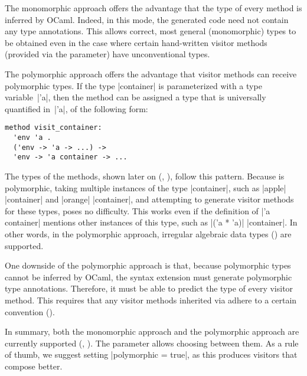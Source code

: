 \documentclass[11pt,a4paper,twoside]{article}
\begin{document}
The monomorphic approach offers the advantage that the type of every method is
inferred by OCaml. Indeed, in this mode, the generated code need not contain
any type annotations. This allows correct, most general (monomorphic) types to
be obtained even in the case where certain hand-written visitor methods
(provided via the \ancestors parameter) have unconventional types.
%

The polymorphic approach offers the advantage that visitor methods can receive
polymorphic types. If the type \oc|container| is parameterized with a type
variable~\oc|'a|, then the method  can be assigned a
type that is universally quantified in~\oc|'a|, of the following form:
%
\begin{mdframed}[backgroundcolor=green!10]
\begin{lstlisting}
method visit_container:
  'env 'a .
  ('env -> 'a -> ...) ->
  'env -> 'a container -> ...
\end{lstlisting}
\end{mdframed}
%
The types of the  methods, shown later on
(, ), follow this pattern.
%
Because  is polymorphic, taking multiple instances of
the type \oc|container|, such as \oc|apple| \oc|container| and \oc|orange|
\oc|container|, and attempting to generate visitor methods for these types,
poses no difficulty. This works even if the definition of \oc|'a container|
mentions other instances of this type, such as \oc|('a * 'a)| \oc|container|.
In other words, in the polymorphic approach, irregular algebraic data types
() are supported.

One downside of the polymorphic approach is that, because polymorphic types
cannot be inferred by OCaml, the \visitors syntax extension must generate
polymorphic type annotations. Therefore, it must be able to predict
the type of every visitor method.
%
%
This requires that any visitor methods inherited via \ancestors adhere to a
certain convention ().

In summary, both the monomorphic approach and the polymorphic approach are
currently supported (,
). The parameter \polymorphic allows
choosing between them. As a rule of thumb, we suggest setting
%
\oc|polymorphic = true|, as this produces visitors that compose better.
\end{document}
